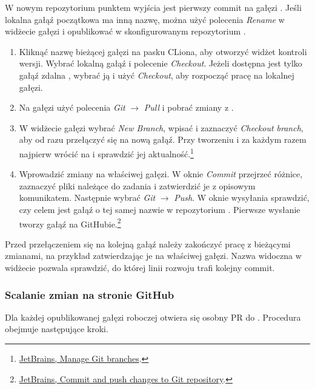 W nowym repozytorium punktem wyjścia jest pierwszy commit
na gałęzi . Jeśli lokalna gałąź początkowa ma inną
nazwę, można użyć polecenia \emph{Rename} w widżecie gałęzi
i opublikować  w skonfigurowanym repozytorium
.

\begin{enumerate}
  \item Kliknąć nazwę bieżącej gałęzi na pasku CLiona, aby otworzyć
        widżet kontroli wersji. Wybrać lokalną gałąź 
        i polecenie \emph{Checkout}. Jeżeli dostępna jest tylko
        gałąź zdalna , wybrać ją i użyć
        \emph{Checkout}, aby rozpocząć pracę na lokalnej gałęzi.
  \item Na gałęzi  użyć polecenia \emph{Git} $\to$
        \emph{Pull} i pobrać zmiany z .
  \item W widżecie gałęzi wybrać \emph{New Branch}, wpisać
         i zaznaczyć \emph{Checkout branch},
        aby od razu przełączyć się na nową gałąź. Przy tworzeniu
         i 
        za każdym razem najpierw wrócić na  i sprawdzić
        jej aktualność.\footnote{\href{https://www.jetbrains.com/help/clion/manage-branches.html}
        {JetBrains, Manage Git branches}.}
  \item Wprowadzić zmiany na właściwej gałęzi. W oknie
        \emph{Commit} przejrzeć różnice, zaznaczyć pliki należące
        do zadania i zatwierdzić je z opisowym komunikatem.
        Następnie wybrać \emph{Git} $\to$ \emph{Push}.
        W oknie wysyłania sprawdzić, czy celem jest gałąź o tej
        samej nazwie w repozytorium . Pierwsze
        wysłanie tworzy gałąź na GitHubie.\footnote{\href{https://www.jetbrains.com/help/clion/commit-and-push-changes.html}
        {JetBrains, Commit and push changes to Git repository}.}
\end{enumerate}

Przed przełączeniem się na kolejną gałąź należy zakończyć
pracę z bieżącymi zmianami, na przykład zatwierdzając je
na właściwej gałęzi. Nazwa widoczna w widżecie pozwala sprawdzić,
do której linii rozwoju trafi kolejny commit.

\subsubsection{Scalanie zmian na stronie GitHub}
\label{sec:pr-scalanie}

Dla każdej opublikowanej gałęzi roboczej otwiera się osobny PR
do . Procedura obejmuje następujące kroki.

